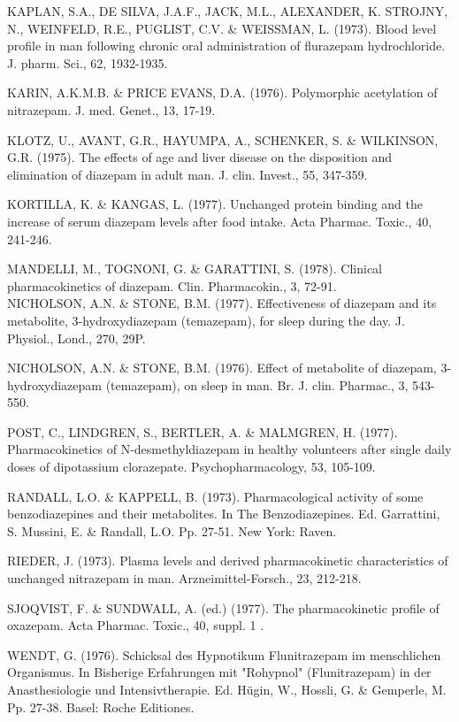 \documentclass[10pt]{article}
\begin{document}
KAPLAN, S.A., DE SILVA, J.A.F., JACK, M.L., ALEXANDER, K. STROJNY, N., WEINFELD, R.E., PUGLIST, C.V. \& WEISSMAN, L. (1973). Blood level profile in man following chronic oral administration of flurazepam hydrochloride. J. pharm. Sci., 62, 1932-1935.

KARIN, A.K.M.B. \& PRICE EVANS, D.A. (1976). Polymorphic acetylation of nitrazepam. J. med. Genet., 13, 17-19.

KLOTZ, U., AVANT, G.R., HAYUMPA, A., SCHENKER, S. \& WILKINSON, G.R. (1975). The effects of age and liver disease on the disposition and elimination of diazepam in adult man. J. clin. Invest., 55, 347-359.

KORTILLA, K. \& KANGAS, L. (1977). Unchanged protein binding and the increase of serum diazepam levels after food intake. Acta Pharmac. Toxic., 40, 241-246.

MANDELLI, M., TOGNONI, G. \& GARATTINI, S. (1978). Clinical pharmacokinetics of diazepam. Clin. Pharmacokin., 3, 72-91.\\
NICHOLSON, A.N. \& STONE, B.M. (1977). Effectiveness of diazepam and its metabolite, 3-hydroxydiazepam (temazepam), for sleep during the day. J. Physiol., Lond., 270, 29P.

NICHOLSON, A.N. \& STONE, B.M. (1976). Effect of metabolite of diazepam, 3-hydroxydiazepam (temazepam), on sleep in man. Br. J. clin. Pharmac., 3, 543-550.

POST, C., LINDGREN, S., BERTLER, A. \& MALMGREN, H. (1977). Pharmacokinetics of N-desmethyldiazepam in healthy volunteers after single daily doses of dipotassium clorazepate. Psychopharmacology, 53, 105-109.

RANDALL, L.O. \& KAPPELL, B. (1973). Pharmacological activity of some benzodiazepines and their metabolites. In The Benzodiazepines. Ed. Garrattini, S. Mussini, E. \& Randall, L.O. Pp. 27-51. New York: Raven.

RIEDER, J. (1973). Plasma levels and derived pharmacokinetic characteristics of unchanged nitrazepam in man. Arzneimittel-Forsch., 23, 212-218.

SJOQVIST, F. \& SUNDWALL, A. (ed.) (1977). The pharmacokinetic profile of oxazepam. Acta Pharmac. Toxic., 40, suppl. 1 .

WENDT, G. (1976). Schicksal des Hypnotikum Flunitrazepam im menschlichen Organismus. In Bisherige Erfahrungen mit "Rohypnol" (Flunitrazepam) in der Anasthesiologie und Intensivtherapie. Ed. Hügin, W., Hossli, G. \& Gemperle, M. Pp. 27-38. Basel: Roche Editiones.
\end{document}
